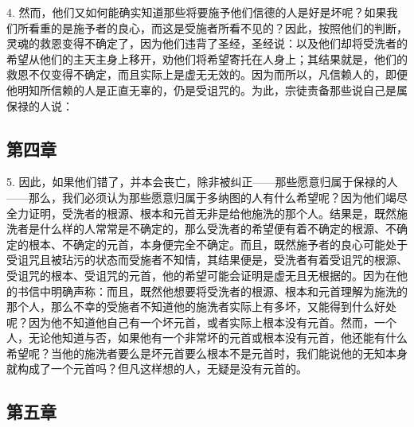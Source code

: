 4. 然而，他们又如何能确实知道那些将要施予他们信德的人是好是坏呢？如果我们所看重的是施予者的良心，而这是受施者所看不见的？因此，按照他们的判断，灵魂的救恩变得不确定了，因为他们违背了圣经，圣经说：以及他们却将受洗者的希望从他们的主天主身上移开，劝他们将希望寄托在人身上；其结果就是，他们的救恩不仅变得不确定，而且实际上是虚无无效的。因为而所以，凡信赖人的，即便他明知所信赖的人是正直无辜的，仍是受诅咒的。为此，宗徒责备那些说自己是属保禄的人说：\par


\subsection{第四章}

5. 因此，如果他们错了，并本会丧亡，除非被纠正——那些愿意归属于保禄的人——那么，我们必须认为那些愿意归属于多纳图的人有什么希望呢？因为他们竭尽全力证明，受洗者的根源、根本和元首无非是给他施洗的那个人。结果是，既然施洗者是什么样的人常常是不确定的，那么受洗者的希望便有着不确定的根源、不确定的根本、不确定的元首，本身便完全不确定。而且，既然施予者的良心可能处于受诅咒且被玷污的状态而受施者不知情，其结果便是，受洗者有着受诅咒的根源、受诅咒的根本、受诅咒的元首，他的希望可能会证明是虚无且无根据的。因为在他的书信中明确声称：而且，既然他想要将受洗者的根源、根本和元首理解为施洗的那个人，那么不幸的受施者不知道他的施洗者实际上有多坏，又能得到什么好处呢？因为他不知道他自己有一个坏元首，或者实际上根本没有元首。然而，一个人，无论他知道与否，如果他有一个非常坏的元首或根本没有元首，他还能有什么希望呢？当他的施洗者要么是坏元首要么根本不是元首时，我们能说他的无知本身就构成了一个元首吗？但凡这样想的人，无疑是没有元首的。\par


\subsection{第五章}


